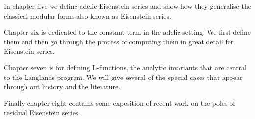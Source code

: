 In chapter five we define adelic Eisenstein series and show how they generalise the classical modular forms also known as Eisenstein series.

Chapter six is dedicated to the constant term in the adelic setting. We first define them and then go through the process of computing them in great detail for Eisenstein series. 

Chapter seven is for defining L-functions, the analytic invariants that are central to the Langlands program. We will give several of the special cases that appear through out history and the literature. 

Finally chapter eight contains some exposition of recent work on the poles of residual Eisenstein series.


